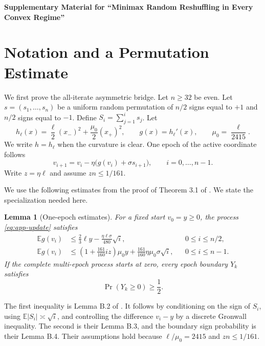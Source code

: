 \documentclass[twoside]{article}
\newtheorem{lemma}[theorem]{Lemma}
\newcommand{\E}{\mathbb E}
\begin{document}
\onecolumn
\begin{center}
{\Large\bf Supplementary Material for
``Minimax Random Reshuffling in Every Convex Regime''}
\end{center}

\section{Notation and a Permutation Estimate}
\label{app:prelim}

We first prove the all-iterate asymmetric bridge. Let $n\ge32$ be even. Let
$s=(s_1,\ldots,s_n)$ be a uniform random permutation of $n/2$ signs equal to
$+1$ and $n/2$ signs equal to $-1$. Define $S_i=\sum_{j=1}^i s_j$. Let
\begin{equation}
 h_\ell(x)=\frac\ell2(x_-)^2+\frac{\mu_0}{2}(x_+)^2,
 \qquad g(x)=h_\ell'(x),
 \qquad \mu_0=\frac{\ell}{2415}.
 \label{eq:app-g}
\end{equation}
We write $h=h_\ell$ when the curvature is clear.
One epoch of the active coordinate follows
\begin{equation}
 v_{i+1}=v_i-\eta\bigl(g(v_i)+\sigma s_{i+1}\bigr),
 \qquad i=0,\ldots,n-1.
 \label{eq:app-update}
\end{equation}
Write $z=\eta\ell$ and assume $zn\le1/161$.

We use the following estimates from the proof of Theorem 3.1 of
\citet{cha2023tighter}. We state the specialization needed here.

\begin{lemma}[One-epoch estimates]
\label{lem:app-cha}
For a fixed start $v_0=y\ge0$, the process \eqref{eq:app-update} satisfies
\begin{align}
 \E g(v_i)
 &\le \frac23\ell y-\frac{\eta\ell\sigma}{480}\sqrt i,
 &&0\le i\le n/2,                                      \label{eq:app-cha1}\\
 \E g(v_i)
 &\le \left(1+\frac{161}{160}iz\right)\mu_0y
 +\frac{161}{160}\eta\mu_0\sigma\sqrt i,
 &&0\le i\le n-1.                                      \label{eq:app-cha2}
\end{align}
If the complete multi-epoch process starts at zero, every epoch boundary
$Y_k$ satisfies
\begin{equation}
 \Pr(Y_k\ge0)\ge\frac12.
 \label{eq:app-half}
\end{equation}
\end{lemma}

The first inequality is Lemma B.2 of \citet{cha2023tighter}. It follows by
conditioning on the sign of $S_i$, using
$\E|S_i|\asymp\sqrt i$, and controlling the difference $v_i-y$ by a discrete
Gronwall inequality. The second is their Lemma B.3, and the boundary sign
probability is their Lemma B.4. Their assumptions hold because
$\ell/\mu_0=2415$ and $zn\le1/161$.
\end{document}
